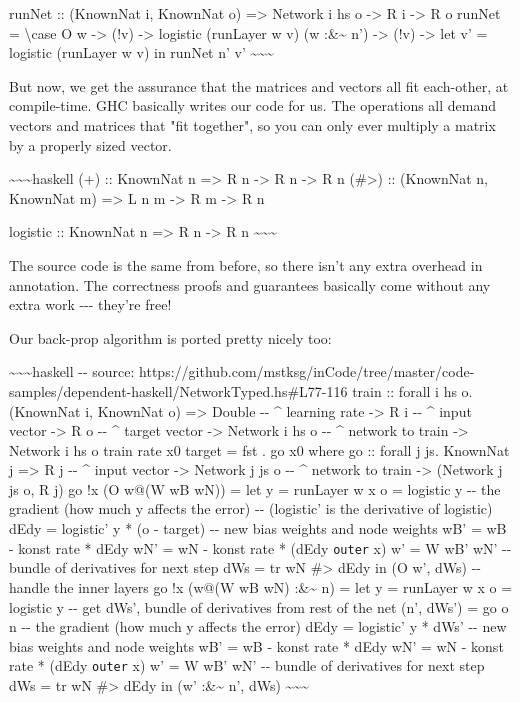 \documentclass[]{article}
\begin{document}
runNet :: (KnownNat i, KnownNat o) =\textgreater{} Network i hs o
-\textgreater{} R i -\textgreater{} R o runNet = \textbackslash{}case O w
-\textgreater{} (!v) -\textgreater{} logistic (runLayer w v) (w
:\&\textasciitilde{} n') -\textgreater{} (!v) -\textgreater{} let v' = logistic
(runLayer w v) in runNet n' v'
\textasciitilde{}\textasciitilde{}\textasciitilde{}

But now, we get the assurance that the matrices and vectors all fit each-other,
at compile-time. GHC basically writes our code for us. The operations all demand
vectors and matrices that "fit together", so you can only ever multiply a matrix
by a properly sized vector.

\textasciitilde{}\textasciitilde{}\textasciitilde{}haskell (+) :: KnownNat n
=\textgreater{} R n -\textgreater{} R n -\textgreater{} R n (\#\textgreater{})
:: (KnownNat n, KnownNat m) =\textgreater{} L n m -\textgreater{} R m
-\textgreater{} R n

logistic :: KnownNat n =\textgreater{} R n -\textgreater{} R n
\textasciitilde{}\textasciitilde{}\textasciitilde{}

The source code is the same from before, so there isn't any extra overhead in
annotation. The correctness proofs and guarantees basically come without any
extra work -\/-\/- they're free!

Our back-prop algorithm is ported pretty nicely too:

\textasciitilde{}\textasciitilde{}\textasciitilde{}haskell -\/- source:
https://github.com/mstksg/inCode/tree/master/code-samples/dependent-haskell/NetworkTyped.hs\#L77-116
train :: forall i hs o. (KnownNat i, KnownNat o) =\textgreater{} Double -\/-
\^{} learning rate -\textgreater{} R i -\/- \^{} input vector -\textgreater{} R
o -\/- \^{} target vector -\textgreater{} Network i hs o -\/- \^{} network to
train -\textgreater{} Network i hs o train rate x0 target = fst . go x0 where go
:: forall j js. KnownNat j =\textgreater{} R j -\/- \^{} input vector
-\textgreater{} Network j js o -\/- \^{} network to train -\textgreater{}
(Network j js o, R j) go !x (O w@(W wB wN)) = let y = runLayer w x o = logistic
y -\/- the gradient (how much y affects the error) -\/- (logistic' is the
derivative of logistic) dEdy = logistic' y * (o - target) -\/- new bias weights
and node weights wB' = wB - konst rate * dEdy wN' = wN - konst rate * (dEdy
\texttt{outer} x) w' = W wB' wN' -\/- bundle of derivatives for next step dWs =
tr wN \#\textgreater{} dEdy in (O w', dWs) -\/- handle the inner layers go !x
(w@(W wB wN) :\&\textasciitilde{} n) = let y = runLayer w x o = logistic y -\/-
get dWs', bundle of derivatives from rest of the net (n', dWs') = go o n -\/-
the gradient (how much y affects the error) dEdy = logistic' y * dWs' -\/- new
bias weights and node weights wB' = wB - konst rate * dEdy wN' = wN - konst rate
* (dEdy \texttt{outer} x) w' = W wB' wN' -\/- bundle of derivatives for next
step dWs = tr wN \#\textgreater{} dEdy in (w' :\&\textasciitilde{} n', dWs)
\textasciitilde{}\textasciitilde{}\textasciitilde{}
\end{document}
